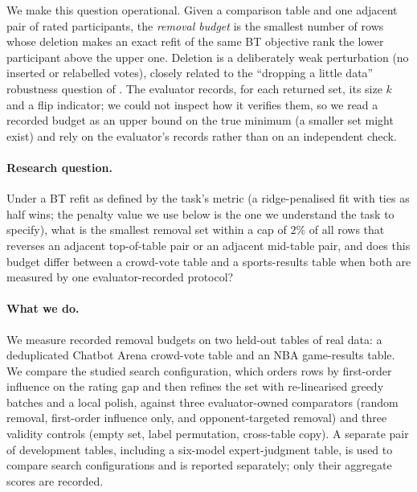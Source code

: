 \documentclass{article}
\begin{document}
We make this question operational. Given a comparison table and one adjacent pair of rated participants, the \emph{removal budget} is the smallest number of rows whose deletion makes an exact refit of the same BT objective rank the lower participant above the upper one. Deletion is a deliberately weak perturbation (no inserted or relabelled votes), closely related to the ``dropping a little data'' robustness question of \citet{Broderick2020AnAF}. The evaluator records, for each returned set, its size $k$ and a flip indicator; we could not inspect how it verifies them, so we read a recorded budget as an upper bound on the true minimum (a smaller set might exist) and rely on the evaluator's records rather than on an independent check.

\paragraph{Research question.} Under a BT refit as defined by the task's metric (a ridge-penalised fit with ties as half wins; the penalty value we use below is the one we understand the task to specify), what is the smallest removal set within a cap of $2\%$ of all rows that reverses an adjacent top-of-table pair or an adjacent mid-table pair, and does this budget differ between a crowd-vote table and a sports-results table when both are measured by one evaluator-recorded protocol?

\paragraph{What we do.} We measure recorded removal budgets on two held-out tables of real data: a deduplicated Chatbot Arena crowd-vote table and an NBA game-results table. We compare the studied search configuration, which orders rows by first-order influence on the rating gap and then refines the set with re-linearised greedy batches and a local polish, against three evaluator-owned comparators (random removal, first-order influence only, and opponent-targeted removal) and three validity controls (empty set, label permutation, cross-table copy). A separate pair of development tables, including a six-model expert-judgment table, is used to compare search configurations and is reported separately; only their aggregate scores are recorded.
\end{document}

